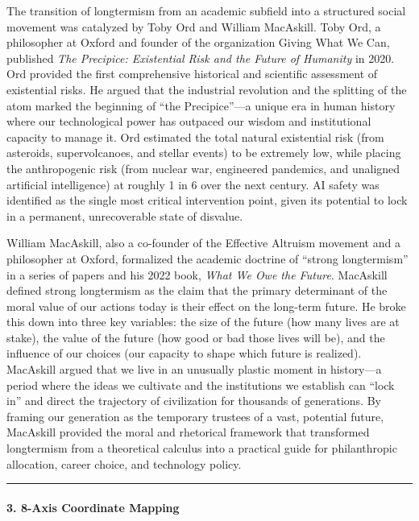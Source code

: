 The transition of longtermism from an academic subfield into a
structured social movement was catalyzed by Toby Ord and William
MacAskill. Toby Ord, a philosopher at Oxford and founder of the
organization Giving What We Can, published \emph{The Precipice:
Existential Risk and the Future of Humanity} in 2020. Ord provided the
first comprehensive historical and scientific assessment of existential
risks. He argued that the industrial revolution and the splitting of the
atom marked the beginning of ``the Precipice''---a unique era in human
history where our technological power has outpaced our wisdom and
institutional capacity to manage it. Ord estimated the total natural
existential risk (from asteroids, supervolcanoes, and stellar events) to
be extremely low, while placing the anthropogenic risk (from nuclear
war, engineered pandemics, and unaligned artificial intelligence) at
roughly 1 in 6 over the next century. AI safety was identified as the
single most critical intervention point, given its potential to lock in
a permanent, unrecoverable state of disvalue.

William MacAskill, also a co-founder of the Effective Altruism movement
and a philosopher at Oxford, formalized the academic doctrine of
``strong longtermism'' in a series of papers and his 2022 book,
\emph{What We Owe the Future}. MacAskill defined strong longtermism as
the claim that the primary determinant of the moral value of our actions
today is their effect on the long-term future. He broke this down into
three key variables: the size of the future (how many lives are at
stake), the value of the future (how good or bad those lives will be),
and the influence of our choices (our capacity to shape which future is
realized). MacAskill argued that we live in an unusually plastic moment
in history---a period where the ideas we cultivate and the institutions
we establish can ``lock in'' and direct the trajectory of civilization
for thousands of generations. By framing our generation as the temporary
trustees of a vast, potential future, MacAskill provided the moral and
rhetorical framework that transformed longtermism from a theoretical
calculus into a practical guide for philanthropic allocation, career
choice, and technology policy.

\begin{center}\rule{0.5\linewidth}{0.5pt}\end{center}

\paragraph{3. 8-Axis Coordinate
Mapping}\label{axis-coordinate-mapping-2}

